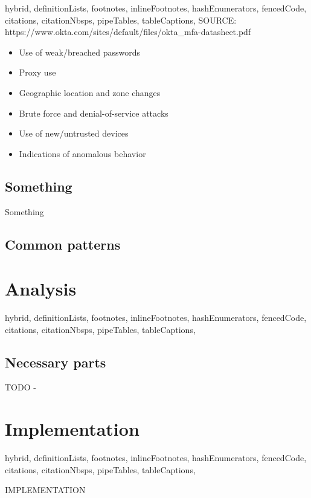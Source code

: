 \documentclass[
  digital,     %
  oneside,     %
  nosansbold,  %
  nocolorbold, %
  lof,         %
  lot,         %
]{fithesis4}
\begin{document}
\begin{markdown*}{%
  hybrid,
  definitionLists,
  footnotes,
  inlineFootnotes,
  hashEnumerators,
  fencedCode,
  citations,
  citationNbsps,
  pipeTables,
  tableCaptions,
}
SOURCE: https://www.okta.com/sites/default/files/okta_mfa-datasheet.pdf

\begin{itemize}
    \item Use of weak/breached passwords
    \item Proxy use
    \item Geographic location and zone changes
    \item Brute force and denial-of-service attacks
    \item Use of new/untrusted devices
    \item Indications of anomalous behavior
\end{itemize}

\section{Something}
Something

\section{Common patterns}

\end{markdown*}

\chapter{Analysis}
\shorthandoff{-}
\shorthandoff{-}
\begin{markdown*}{%
  hybrid,
  definitionLists,
  footnotes,
  inlineFootnotes,
  hashEnumerators,
  fencedCode,
  citations,
  citationNbsps,
  pipeTables,
  tableCaptions,
}

\section{Necessary parts}
TODO -


\end{markdown*}
\shorthandon{-}


\chapter{Implementation}
\shorthandoff{-}
\begin{markdown*}{%
  hybrid,
  definitionLists,
  footnotes,
  inlineFootnotes,
  hashEnumerators,
  fencedCode,
  citations,
  citationNbsps,
  pipeTables,
  tableCaptions,
}

IMPLEMENTATION
\end{markdown*}
\shorthandon{-}
\end{document}
